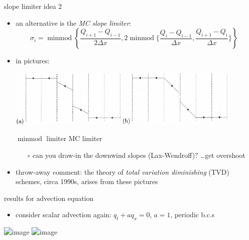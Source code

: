 \documentclass[10pt,dvipsnames,usepdftitle=false,
hyperref={pdftitle = {Finite volume methods},
    pdfauthor = {Ed Bueler}}]{beamer}
\newcommand{\minmod}{\operatorname{minmod}}
\begin{document}
\begin{frame}{slope limiter idea 2}

\begin{itemize}
\item an alternative is the \alert{\emph{MC slope limiter}:}
    $$\sigma_i = \minmod\left\{\frac{Q_{i+1}-Q_{i-1}}{2\Delta x},2\minmod\Big\{\frac{Q_i-Q_{i-1}}{\Delta x},\frac{Q_{i+1}-Q_i}{\Delta x}\Big\}\right\}$$
\item in pictures:

\begin{center}
\includegraphics[width=0.9\textwidth]{figs/leveque6p5}
\end{center}

\hspace{15mm} $\minmod$ limiter \hfill MC limiter \hspace{15mm} \phantom{x}

\medskip
    \begin{itemize}
    \item[$\circ$] can you draw-in the downwind slopes (Lax-Wendroff)?  \dots get overshoot
    \end{itemize}
\item throw-away comment: the theory of \emph{total variation diminishing} (TVD) schemes, circa 1990s, arises from these pictures
\end{itemize}
\end{frame}


\begin{frame}{results for advection equation}

\begin{itemize}
\item consider scalar advection again: $q_t + a q_x=0$, $a=1$, periodic b.c.s
\end{itemize}

\begin{center}
\includegraphics<1>[width=0.7\textwidth]{figs/leveque6p1} \includegraphics<2>[width=0.7\textwidth]{figs/leveque6p2}
\end{center}
\end{frame}
\end{document}

